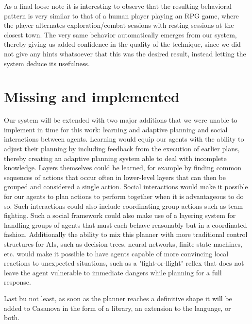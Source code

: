 As a final loose note it is interesting to observe that the resulting behavioral pattern is very similar to that of a human player playing an RPG game, where the player alternates exploration/combat sessions with resting sessions at the closest town. The very same behavior automatically emerges from our system, thereby giving us added confidence in the quality of the technique, since we did not give any hints whatsoever that this was the desired result, instead letting the system deduce its usefulness.


\section{Missing and implemented}
\label{sec:discussion}

Our system will be extended with two major additions that we were unable to implement in time for this work: learning and adaptive planning and social interactions between agents. Learning would equip our agents with the ability to adjust their planning by including feedback from the execution of earlier plans, thereby creating an adaptive planning system able to deal with incomplete knowledge. Layers themselves could be learned, for example by finding common sequences of actions that occur often in lower-level layers that can then be grouped and considered a single action. Social interactions would make it possible for our agents to plan actions to perform together when it is advantageous to do so. Such interactions could also include coordinating group actions such as team fighting. Such a social framework could also make use of a layering system for handling groups of agents that must each behave reasonably but in a coordinated fashion. Additionally the ability to mix this planner with more traditional control structures for AIs, such as decision trees, neural networks, finite state machines, etc. would make it possible to have agents capable of more convincing local reactions to unexpected situations, such as a "fight-or-flight" reflex that does not leave the agent vulnerable to immediate dangers while planning for a full response.

Last bu not least, as soon as the planner reaches a definitive shape it will be added to Casanova in the form of a library, an extension to the language, or both.
